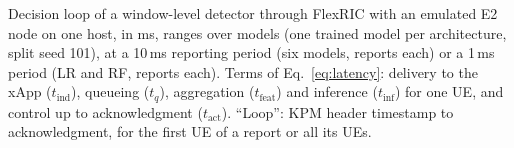 \begin{table}[t]
\caption{Decision loop of a window-level detector through FlexRIC with an emulated E2 node on one host, in ms, ranges over models (one trained model per architecture, split seed 101), at a 10\,ms reporting period (six models, \RicNten{} reports each) or a 1\,ms period (LR and RF, \RicNone{} reports each). Terms of Eq.~\eqref{eq:latency}: delivery to the xApp ($t_{\mathrm{ind}}$), queueing ($t_{q}$), aggregation ($t_{\mathrm{feat}}$) and inference ($t_{\mathrm{inf}}$) for one UE, and control up to acknowledgment ($t_{\mathrm{act}}$). ``Loop'': KPM header timestamp to acknowledgment, for the first UE of a report or all its UEs.}
\label{tab:ric}
\centering
\scriptsize
\setlength{\tabcolsep}{2.4pt}

\end{table}
